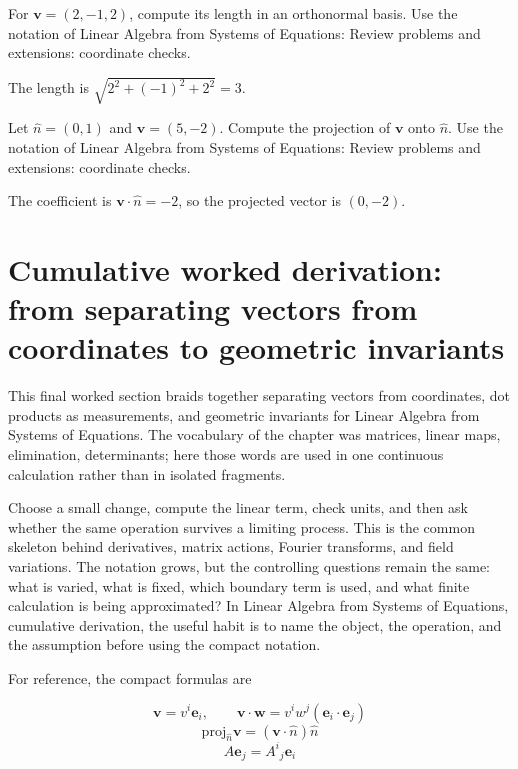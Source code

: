 \begin{exercise}
For \(\bm v=(2,-1,2)\), compute its length in an orthonormal basis.  Use the notation of Linear Algebra from Systems of Equations: Review problems and extensions: coordinate checks.
\begin{answer}
The length is \(\sqrt{2^2+(-1)^2+2^2}=3\).
\end{answer}
\end{exercise}

\begin{exercise}
Let \(\hat n=(0,1)\) and \(\bm v=(5,-2)\).  Compute the projection of \(\bm v\) onto \(\hat n\).  Use the notation of Linear Algebra from Systems of Equations: Review problems and extensions: coordinate checks.
\begin{answer}
The coefficient is \(\bm v\cdot\hat n=-2\), so the projected vector is \((0,-2)\).
\end{answer}
\end{exercise}



\section{Cumulative worked derivation: from separating vectors from coordinates to geometric invariants}

This final worked section braids together separating vectors from coordinates, dot products as measurements, and geometric invariants for Linear Algebra from Systems of Equations.  The vocabulary of the chapter was matrices, linear maps, elimination, determinants; here those words are used in one continuous calculation rather than in isolated fragments.

Choose a small change, compute the linear term, check units, and then ask whether the same operation survives a limiting process.  This is the common skeleton behind derivatives, matrix actions, Fourier transforms, and field variations.  The notation grows, but the controlling questions remain the same: what is varied, what is fixed, which boundary term is used, and what finite calculation is being approximated?  In Linear Algebra from Systems of Equations, cumulative derivation, the useful habit is to name the object, the operation, and the assumption before using the compact notation.

For reference, the compact formulas are

\[
  \bm v=v^i\bm e_i,\qquad \bm v\cdot\bm w=v^iw^j(\bm e_i\cdot\bm e_j)
\]
\[
  \mathrm{proj}_{\hat n}\bm v=(\bm v\cdot\hat n)\hat n
\]
\[
  A\bm e_j=A^i{}_j\bm e_i
\]

